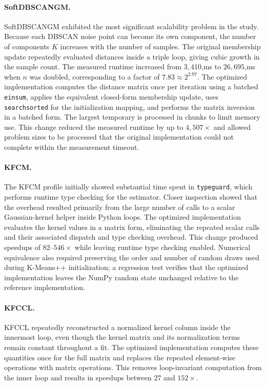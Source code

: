 \documentclass[twoside,11pt]{article}
\begin{document}
\paragraph{SoftDBSCANGM.}
SoftDBSCANGM exhibited the most significant scalability problem in the study.
Because each DBSCAN noise point can become its own component, the number of
components $K$ increases with the number of samples. The original membership
update repeatedly evaluated distances inside a triple loop, giving cubic
growth in the sample count. The measured runtime increased from
$3{,}410$,ms to $26{,}695$,ms when $n$ was doubled, corresponding to a
factor of $7.83 \approx 2^{2.97}$. The optimized implementation computes the
distance matrix once per iteration using a batched \texttt{einsum}, applies
the equivalent closed-form membership update, uses \texttt{searchsorted} for
the initialization mapping, and performs the matrix inversion in a batched
form. The largest temporary is processed in chunks to limit memory use. This
change reduced the measured runtime by up to $4{,}507\times$ and allowed
problem sizes to be processed that the original implementation could not
complete within the measurement timeout.

\paragraph{KFCM.}
The KFCM profile initially showed substantial time spent in
\texttt{typeguard}, which performs runtime type checking for the estimator.
Closer inspection showed that the overhead resulted primarily from the large
number of calls to a scalar Gaussian-kernel helper inside Python loops. The
optimized implementation evaluates the kernel values in a matrix form,
eliminating the repeated scalar calls and their associated dispatch and type
checking overhead. This change produced speedups of $82$--$546\times$ while
leaving runtime type checking enabled. Numerical equivalence also required
preserving the order and number of random draws used during K-Means++
initialization; a regression test verifies that the optimized implementation
leaves the NumPy random state unchanged relative to the reference
implementation.

\paragraph{KFCCL.}
KFCCL repeatedly reconstructed a normalized kernel column inside the innermost
loop, even though the kernel matrix and its normalization terms remain
constant throughout a fit. The optimized implementation computes these
quantities once for the full matrix and replaces the repeated element-wise
operations with matrix operations. This removes loop-invariant computation
from the inner loop and results in speedups between $27$ and $152\times$.
\end{document}
